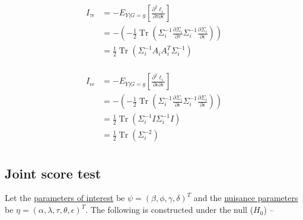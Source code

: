 \documentclass[hidelinks]{article}
\DeclareMathOperator{\Tr}{Tr}
\begin{document}
\begingroup
\large
\begin{equation}
\begin{split}
I_{\tau\epsilon} &= - E_{Y|G=g}\left[ \frac{\partial^2 \ell_i }{\partial \tau \partial \epsilon}\right]\\
&= - \left(-\frac{1}{2} \Tr\left(\Sigma_i^{-1}\frac{\partial \Sigma_i }{\partial \tau} \Sigma_i^{-1}\frac{\partial \Sigma_i }{\partial \epsilon} \right) \right)\\
&= \frac{1}{2} \Tr \left(\Sigma_i^{-1} A_i A_i^T \Sigma_i^{-1}\right)\\
\end{split}
\end{equation}
\endgroup

\begingroup
\large
\begin{equation}
\begin{split}
I_{\epsilon\epsilon} &= - E_{Y|G=g}\left[ \frac{\partial^2 \ell_i }{\partial \epsilon \partial \epsilon}\right]\\
&= - \left(-\frac{1}{2} \Tr\left(\Sigma_i^{-1}\frac{\partial \Sigma_i }{\partial \epsilon} \Sigma_i^{-1}\frac{\partial \Sigma_i }{\partial \epsilon} \right) \right)\\
&= \frac{1}{2} \Tr \left(\Sigma_i^{-1} I \Sigma_i^{-1}I\right)\\
&= \frac{1}{2} \Tr \left(\Sigma_i^{-2} \right)\\
\end{split}
\end{equation}
\endgroup

%
\subsection{Joint score test}
%
Let the \underline{parameters of interest} be $\psi = (\beta, \phi, \gamma, \delta)^T$ and the \underline{nuisance parameters} be $\eta = (\alpha, \lambda, \tau, \theta, \epsilon)^T$. The following is constructed under the null ($H_0$) --
\end{document}
